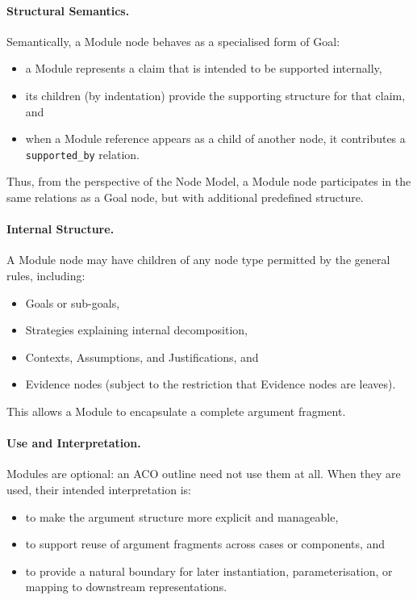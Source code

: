 \documentclass[11pt]{article}
\begin{document}
\paragraph{Structural Semantics.}
Semantically, a Module node behaves as a specialised form of Goal:
\begin{itemize}[leftmargin=2em]
  \item a Module represents a claim that is intended to be supported internally,
  \item its children (by indentation) provide the supporting structure for that claim, and
  \item when a Module reference appears as a child of another node, it contributes a
        \texttt{supported\_by} relation.
\end{itemize}

Thus, from the perspective of the Node Model, a Module node participates in the same
relations as a Goal node, but with additional predefined structure.

\paragraph{Internal Structure.}
A Module node may have children of any node type permitted by the general rules,
including:
\begin{itemize}[leftmargin=2em]
  \item Goals or sub-goals,
  \item Strategies explaining internal decomposition,
  \item Contexts, Assumptions, and Justifications, and
  \item Evidence nodes (subject to the restriction that Evidence nodes are leaves).
\end{itemize}

This allows a Module to encapsulate a complete argument fragment.

\paragraph{Use and Interpretation.}
Modules are optional: an ACO outline need not use them at all. When they are used,
their intended interpretation is:
\begin{itemize}[leftmargin=2em]
  \item to make the argument structure more explicit and manageable,
  \item to support reuse of argument fragments across cases or components, and
  \item to provide a natural boundary for later instantiation, parameterisation,
        or mapping to downstream representations.
\end{itemize}
\end{document}
